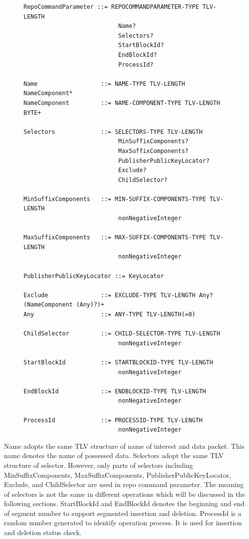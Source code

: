 \documentclass{acm_proc_article-sp}
\begin{document}
\begin{figure}
\begin{framed}
\begin{BVerbatim}
RepoCommandParameter ::= REPOCOMMANDPARAMETER-TYPE TLV-LENGTH
                           Name?
                           Selectors?
                           StartBlockId?
                           EndBlockId?
                           ProcessId?

Name                  ::= NAME-TYPE TLV-LENGTH NameComponent*
NameComponent         ::= NAME-COMPONENT-TYPE TLV-LENGTH BYTE+

Selectors             ::= SELECTORS-TYPE TLV-LENGTH
                           MinSuffixComponents?
                           MaxSuffixComponents?
                           PublisherPublicKeyLocator?
                           Exclude?
                           ChildSelector?

MinSuffixComponents   ::= MIN-SUFFIX-COMPONENTS-TYPE TLV-LENGTH
                           nonNegativeInteger

MaxSuffixComponents   ::= MAX-SUFFIX-COMPONENTS-TYPE TLV-LENGTH
                           nonNegativeInteger

PublisherPublicKeyLocator ::= KeyLocator

Exclude               ::= EXCLUDE-TYPE TLV-LENGTH Any? (NameComponent (Any)?)+
Any                   ::= ANY-TYPE TLV-LENGTH(=0)

ChildSelector         ::= CHILD-SELECTOR-TYPE TLV-LENGTH
                           nonNegativeInteger

StartBlockId          ::= STARTBLOCKID-TYPE TLV-LENGTH
                           nonNegativeInteger

EndBlockId            ::= ENDBLOCKID-TYPE TLV-LENGTH
                           nonNegativeInteger

ProcessId             ::= PROCESSID-TYPE TLV-LENGTH
                           nonNegativeInteger
\end{BVerbatim}
\end{framed}
\end{figure}

Name adopts the same TLV structure of name of interest and data packet. This name denotes the name of possessed data. Selectors adopt the same TLV structure of selector\cite{selector}. However, only parts of selectors including MinSuffixComponents, MaxSuffixComponents, PublisherPublicKeyLocator, Exclude, and ChildSelector are used in repo command parameter. The meaning of selectors is not the same in different operations which will be discussed in the following sections. StartBlockId and EndBlockId denotes the beginning and end of segment number to support segmented insertion and deletion. ProcessId is a random number generated to identify operation process. It is used for insertion and deletion status check.
\end{document}
